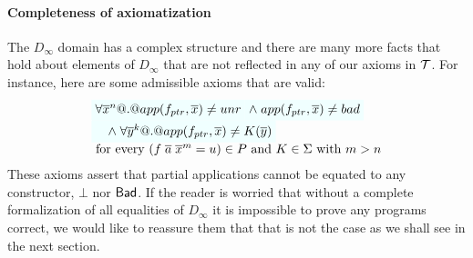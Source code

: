 \paragraph{Completeness of axiomatization} 

The $D_\infty$ domain has a complex structure and there are many more facts that 
hold about elements of $D_\infty$ that are not reflected in any of our axioms in ${\cal T}$. 
For instance, here are some admissible axioms that are valid: 
\[\begin{array}{l}
    \formula{\forall \oln{x}{n} @.@ app(f_{ptr},\xs) \neq \unr} 
    \formula{\land\; app(f_{ptr},\xs) \neq \bad} \\
    \formula{\quad\land\; \forall \oln{y}{k} @.@ app(f_{ptr},\xs) \neq K(\ol{y})} \\
    \text{ for every } (f\;\ol{a}\;\oln{x}{m} = u) \in P  
    \text{ and } K \in \Sigma \text{ with } m > n
\end{array}\]
These axioms assert that partial applications cannot be equated to 
any constructor, $\bot$ nor $\mathsf{Bad}$. If the reader is worried that without a 
complete formalization of all equalities of $D_\infty$ it is impossible to prove any 
programs correct, we would like to reassure them that that is not the case as we 
shall see in the next section.











